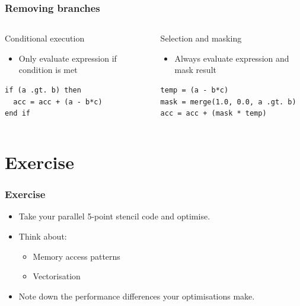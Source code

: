 \documentclass{beamer}
\begin{document}
\begin{frame}[fragile]
\frametitle{Removing branches}
\begin{columns}

\begin{column}{0.5\textwidth}
Conditional execution
\begin{itemize}
  \item Only evaluate expression if condition is met
\end{itemize}
\begin{verbatim}
if (a .gt. b) then
  acc = acc + (a - b*c)
end if
\end{verbatim}
\end{column}

\begin{column}{0.5\textwidth}
Selection and masking
\begin{itemize}
  \item Always evaluate expression and mask result
\end{itemize}
\begin{verbatim}
temp = (a - b*c)
mask = merge(1.0, 0.0, a .gt. b)
acc = acc + (mask * temp)
\end{verbatim}
\end{column}

\end{columns}
\end{frame}

\section{Exercise}
\begin{frame}
\frametitle{Exercise}
\begin{itemize}
  \item Take your parallel 5-point stencil code and optimise.
  \item Think about:
    \begin{itemize}
      \item Memory access patterns
      \item Vectorisation
    \end{itemize}
  \item Note down the performance differences your optimisations make.
\end{itemize}
\end{frame}

\end{document}
